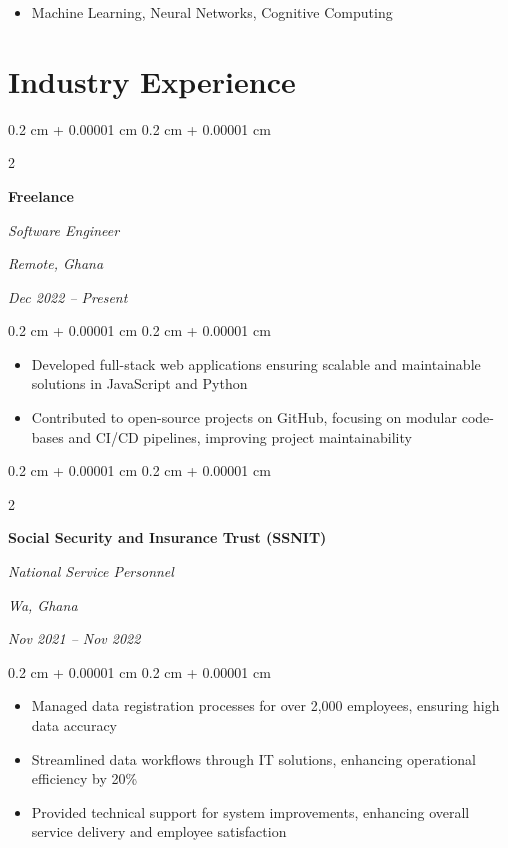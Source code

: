 \documentclass[10pt, letterpaper]{article}
\newenvironment{highlights}{
    \begin{itemize}[
        topsep=0.10 cm,
        parsep=0.10 cm,
        partopsep=0pt,
        itemsep=0pt,
        leftmargin=0.4 cm + 10pt
    ]
}{
    \end{itemize}
} %
\newenvironment{onecolentry}{
    \begin{adjustwidth}{
        0.2 cm + 0.00001 cm
    }{
        0.2 cm + 0.00001 cm
    }
}{
    \end{adjustwidth}
} %
\newenvironment{twocolentry}[2][]{
    \onecolentry
    \def\secondColumn{#2}
    \setcolumnwidth{\fill, 4.5 cm}
    \begin{paracol}{2}
}{
    \switchcolumn \raggedleft \secondColumn
    \end{paracol}
    \endonecolentry
} %
\begin{document}
    \begin{highlights}
        \item Machine Learning, Neural Networks, Cognitive Computing
    \end{highlights}

    
    \section{Industry Experience}

        \begin{twocolentry}{
        \textit{Remote, Ghana}    
            
        \textit{Dec 2022 – Present}}
            \textbf{Freelance}
            
            \textit{Software Engineer}
        \end{twocolentry}

        \vspace{0.10 cm}
        \begin{onecolentry}
            \begin{highlights}
                \item Developed full-stack web applications ensuring scalable and maintainable solutions in JavaScript and Python
                \item  Contributed to open-source projects on GitHub, focusing on modular code-bases and CI/CD pipelines, improving
                project maintainability
            \end{highlights}
        \end{onecolentry}


        \vspace{0.2 cm}

        \begin{twocolentry}{
        \textit{Wa, Ghana}    
            
        \textit{Nov 2021 – Nov 2022}}
            \textbf{Social Security and Insurance Trust (SSNIT)}
            
            \textit{National Service Personnel}
        \end{twocolentry}

        \vspace{0.10 cm}
        \begin{onecolentry}
            \begin{highlights}
                 \item Managed data registration processes for over 2,000 employees, ensuring high data accuracy
                \item Streamlined data workflows through IT solutions, enhancing operational efficiency by 20\%
                \item Provided technical support for system improvements, enhancing overall service delivery and employee satisfaction
            \end{highlights}
        \end{onecolentry}
\end{document}
